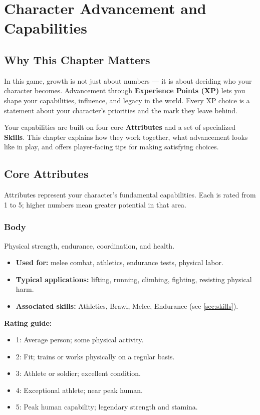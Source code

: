 \chapter{Character Advancement and Capabilities}
\label{ch:advancement}

\section*{Why This Chapter Matters}

In this game, growth is not just about numbers — it is about deciding who your
character becomes. Advancement through \textbf{Experience Points (XP)} lets you
shape your capabilities, influence, and legacy in the world. Every XP choice is
a statement about your character's priorities and the mark they leave behind.

Your capabilities are built on four core \textbf{Attributes} and a set of
specialized \textbf{Skills}. This chapter explains how they work together,
what advancement looks like in play, and offers player‑facing tips for making
satisfying choices.

\section{Core Attributes}
\label{sec:core-attributes}

Attributes represent your character's fundamental capabilities. Each is rated
from 1 to 5; higher numbers mean greater potential in that area.

\subsection{Body}
\label{sec:attribute-body}
Physical strength, endurance, coordination, and health.
\begin{itemize}
  \item \textbf{Used for:} melee combat, athletics, endurance tests, physical labor.
  \item \textbf{Typical applications:} lifting, running, climbing, fighting, resisting physical harm.
  \item \textbf{Associated skills:} Athletics, Brawl, Melee, Endurance (see \ref{sec:skills}).
\end{itemize}
\textbf{Rating guide:}
\begin{itemize}
  \item 1: Average person; some physical activity.
  \item 2: Fit; trains or works physically on a regular basis.
  \item 3: Athlete or soldier; excellent condition.
  \item 4: Exceptional athlete; near peak human.
  \item 5: Peak human capability; legendary strength and stamina.
\end{itemize}

